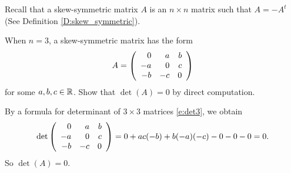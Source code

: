 \documentclass{ximera}
\begin{document}
Recall that a skew-symmetric matrix $A$ is an $n\times n$ matrix such that $A=-A^t$ (See Definition \ref{D:skew_symmetric}).
\begin{exercise} \label{YZ_7.1_skewsym1}
When $n=3$, a skew-symmetric matrix has the form
\[
A=\left(\begin{array}{rrrrrrrrrrrrrrrrrr} 0&a&b\\-a&0&c\\-b&-c&0 \end{array}\right)
\]
for some $a,b,c\in \mbox{$\mathbb{R}$}$. Show that $\det(A)=0$ by direct computation.

\begin{solution}
\soln
By a formula for determinant of $3\times 3$ matrices \eqref{e:det3}, we obtain 
\[
\det\left(\begin{array}{rrrrrrrrrrrrrrrrrr} 0&a&b\\-a&0&c\\-b&-c&0 \end{array}\right)=0 + ac(-b) + b(-a)(-c) - 0 - 0 - 0 = 0.
\]
So $\det(A)=0$.
\end{solution}
\end{exercise}
\end{document}
